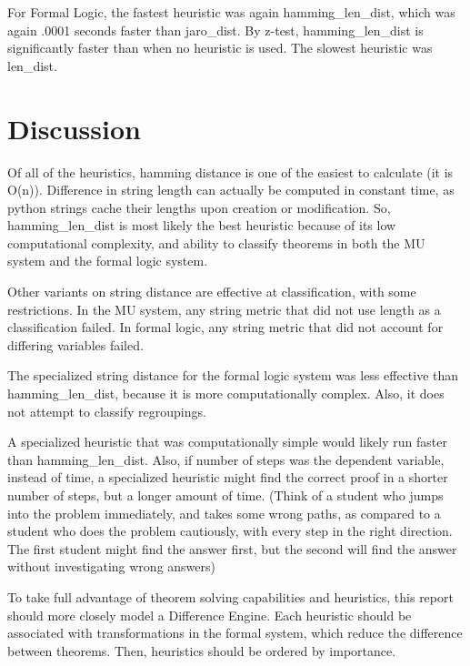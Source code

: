 \documentclass{article}
\begin{document}
For Formal Logic, the fastest heuristic was again hamming\_len\_dist, which was again .0001 seconds faster than jaro\_dist.
By z-test, hamming\_len\_dist is significantly faster than when no heuristic is used. 
The slowest heuristic was len\_dist. 

\section{Discussion}

Of all of the heuristics, hamming distance is one of the easiest to calculate (it is O(n)).
Difference in string length can actually be computed in constant time, as python strings cache their lengths upon creation or modification.
So, hamming\_len\_dist is most likely the best heuristic because of its low computational complexity, and ability to classify theorems in both the MU system and the formal logic system.

Other variants on string distance are effective at classification, with some restrictions.
In the MU system, any string metric that did not use length as a classification failed.
In formal logic, any string metric that did not account for differing variables failed.

The specialized string distance for the formal logic system was less effective than hamming\_len\_dist, because it is more computationally complex.
Also, it does not attempt to classify regroupings.

A specialized heuristic that was computationally simple would likely run faster than hamming\_len\_dist.
Also, if number of steps was the dependent variable, instead of time, a specialized heuristic might find the correct proof in a shorter number of steps, but a longer amount of time. 
(Think of a student who jumps into the problem immediately, and takes some wrong paths, as compared to a student who does the problem cautiously, with every step in the right direction. 
The first student might find the answer first, but the second will find the answer without investigating wrong answers)

To take full advantage of theorem solving capabilities and heuristics, this report should more closely model a Difference Engine.
Each heuristic should be associated with transformations in the formal system, which reduce the difference between theorems. 
Then, heuristics should be ordered by importance.
\end{document}
